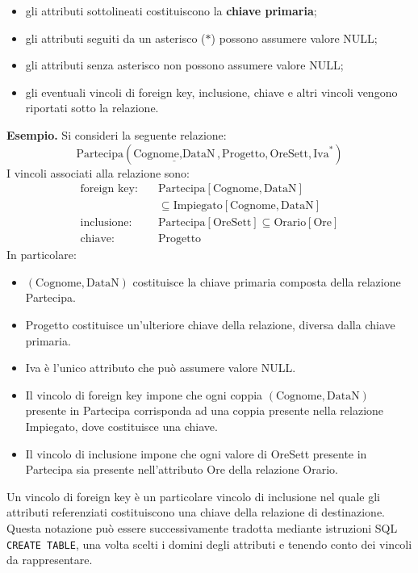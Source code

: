 \begin{itemize}
    \item gli attributi sottolineati costituiscono
    la \textbf{chiave primaria};

    \item gli attributi seguiti da un asterisco
    ($*$) possono assumere valore NULL;

    \item gli attributi senza asterisco non
    possono assumere valore NULL;

    \item gli eventuali vincoli di foreign key,
    inclusione, chiave e altri vincoli vengono
    riportati sotto la relazione.
\end{itemize}
\noindent
\textcolor{verdeEsempio}{\textbf{Esempio. }}
Si consideri la seguente relazione:
\[
\text{Partecipa}(
\underline{\text{Cognome},\text{DataN}},
\text{Progetto},\text{OreSett},\text{Iva}^{*})
\]
\noindent
I vincoli associati alla relazione sono:
\[
\begin{aligned}
\text{foreign key:}\quad
&\text{Partecipa}[\text{Cognome},\text{DataN}]\\
&\subseteq
\text{Impiegato}[\text{Cognome},\text{DataN}]\\[4pt]
\text{inclusione:}\quad
&\text{Partecipa}[\text{OreSett}]
\subseteq \text{Orario}[\text{Ore}]\\[4pt]
\text{chiave:}\quad
&\text{Progetto}
\end{aligned}
\]
\noindent
In particolare:
\begin{itemize}
    \item $(\text{Cognome},\text{DataN})$
    costituisce la chiave primaria composta
    della relazione Partecipa.

    \item Progetto costituisce un'ulteriore
    chiave della relazione, diversa dalla
    chiave primaria.

    \item Iva è l'unico attributo che può
    assumere valore NULL.

    \item Il vincolo di foreign key impone che
    ogni coppia $(\text{Cognome},\text{DataN})$
    presente in Partecipa corrisponda ad una
    coppia presente nella relazione Impiegato,
    dove costituisce una chiave.

    \item Il vincolo di inclusione impone che
    ogni valore di OreSett presente in
    Partecipa sia presente nell'attributo Ore
    della relazione Orario.
\end{itemize}
\noindent
Un vincolo di foreign key è un particolare
vincolo di inclusione nel quale gli attributi
referenziati costituiscono una chiave della
relazione di destinazione.\medskip\\
\noindent
Questa notazione può essere successivamente
tradotta mediante istruzioni SQL
\texttt{CREATE TABLE}, una volta scelti
i domini degli attributi e tenendo conto
dei vincoli da rappresentare.

